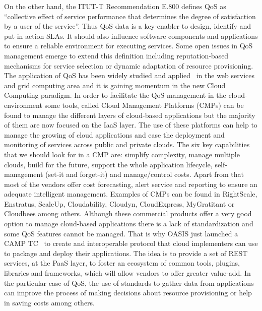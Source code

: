 On the other hand, the ITUT-T Recommendation E.800 defines QoS as ``collective effect of service performance that determines the degree of satisfaction by a user of the service''. 
Thus QoS data is a key-enabler to design, identify and put in action SLAs. It should also influence software components and applications to ensure a 
reliable environment for executing services. Some open issues in QoS management emerge to extend this definition including reputation-based mechanisms 
for service selection or dynamic adaptation of resource provisioning. The application of QoS has been widely studied and applied~\cite{Conejero:2012:MSQ:2357487.2357591,Pedersen:2011:AMQ:2114495.2115542} 
in the web services and grid computing area and it is gaining momentum in the new Cloud Computing paradigm. In order to facilitate the QoS management in the cloud-environment 
some tools, called Cloud Management Platforms (CMPs) can be found to manage the different layers of cloud-based applications but the majority of them are 
now focused on the IaaS layer. The use of these platforms can help to manage the growing of cloud applications and ease the deployment and monitoring of services across 
public and private clouds. The six key capabilities~\cite{Kephart2012} that we should look for in a CMP are: simplify complexity, 
manage multiple clouds, build for the future, support the whole application lifecycle, self-management (set-it and forget-it) and manage/control costs. 
Apart from that most of the vendors offer cost forecasting, alert service and reporting to ensure an adequate intelligent management. 
Examples of CMPs can be found in RightScale, Enstratus, ScaleUp, Cloudability, Cloudyn, CloudExpress, MyGratitant or Cloudbees among others. 
Although these commercial products offer a very good option to manage cloud-based applications there is a lack of standardization and some 
QoS features cannot be managed. That is why OASIS just launched a CAMP TC~\cite{OASISCamp} to create and interoperable protocol that cloud 
implementers can use to package and deploy their applications. The idea is to provide a set of REST services, at the PaaS layer, to foster an ecosystem of 
common tools, plugins, libraries and frameworks, which will allow vendors to offer greater value-add. In the particular case of QoS, the use of standards to gather data 
from applications can improve the process of making decisions about resource provisioning or help in saving costs among others.



